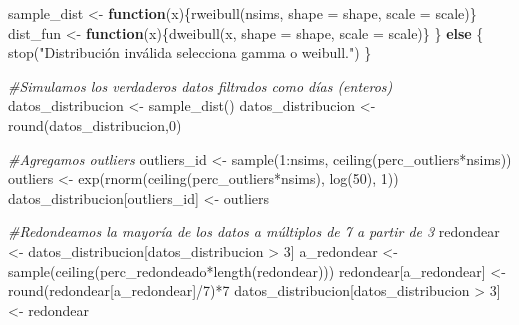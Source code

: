 \documentclass[
]{article}
\newenvironment{Shaded}{\begin{snugshade}}{\end{snugshade}}
\newcommand{\AttributeTok}[1]{\textcolor[rgb]{0.77,0.63,0.00}{#1}}
\newcommand{\CommentTok}[1]{\textcolor[rgb]{0.56,0.35,0.01}{\textit{#1}}}
\newcommand{\ControlFlowTok}[1]{\textcolor[rgb]{0.13,0.29,0.53}{\textbf{#1}}}
\newcommand{\DecValTok}[1]{\textcolor[rgb]{0.00,0.00,0.81}{#1}}
\newcommand{\FunctionTok}[1]{\textcolor[rgb]{0.00,0.00,0.00}{#1}}
\newcommand{\NormalTok}[1]{#1}
\newcommand{\OtherTok}[1]{\textcolor[rgb]{0.56,0.35,0.01}{#1}}
\newcommand{\SpecialCharTok}[1]{\textcolor[rgb]{0.00,0.00,0.00}{#1}}
\newcommand{\StringTok}[1]{\textcolor[rgb]{0.31,0.60,0.02}{#1}}
\begin{document}
\begin{Shaded}
\begin{Highlighting}[]
\NormalTok{  sample\_dist  }\OtherTok{\textless{}{-}} \ControlFlowTok{function}\NormalTok{(x)\{}\FunctionTok{rweibull}\NormalTok{(nsims, }\AttributeTok{shape =}\NormalTok{ shape, }\AttributeTok{scale =}\NormalTok{ scale)\}}
\NormalTok{  dist\_fun     }\OtherTok{\textless{}{-}} \ControlFlowTok{function}\NormalTok{(x)\{}\FunctionTok{dweibull}\NormalTok{(x, }\AttributeTok{shape =}\NormalTok{ shape, }\AttributeTok{scale =}\NormalTok{ scale)\}}
\NormalTok{\} }\ControlFlowTok{else}\NormalTok{ \{}
  \FunctionTok{stop}\NormalTok{(}\StringTok{"Distribución inválida selecciona \textquotesingle{}gamma\textquotesingle{} o \textquotesingle{}weibull\textquotesingle{}."}\NormalTok{)}
\NormalTok{\}}

\CommentTok{\#Simulamos los verdaderos datos filtrados como días (enteros)}
\NormalTok{datos\_distribucion }\OtherTok{\textless{}{-}} \FunctionTok{sample\_dist}\NormalTok{()}
\NormalTok{datos\_distribucion }\OtherTok{\textless{}{-}} \FunctionTok{round}\NormalTok{(datos\_distribucion,}\DecValTok{0}\NormalTok{)}

\CommentTok{\#Agregamos outliers}
\NormalTok{outliers\_id }\OtherTok{\textless{}{-}} \FunctionTok{sample}\NormalTok{(}\DecValTok{1}\SpecialCharTok{:}\NormalTok{nsims, }\FunctionTok{ceiling}\NormalTok{(perc\_outliers}\SpecialCharTok{*}\NormalTok{nsims))}
\NormalTok{outliers    }\OtherTok{\textless{}{-}} \FunctionTok{exp}\NormalTok{(}\FunctionTok{rnorm}\NormalTok{(}\FunctionTok{ceiling}\NormalTok{(perc\_outliers}\SpecialCharTok{*}\NormalTok{nsims), }\FunctionTok{log}\NormalTok{(}\DecValTok{50}\NormalTok{), }\DecValTok{1}\NormalTok{))}
\NormalTok{datos\_distribucion[outliers\_id] }\OtherTok{\textless{}{-}}\NormalTok{ outliers}

\CommentTok{\#Redondeamos la mayoría de los datos a múltiplos de 7 a partir de 3}
\NormalTok{redondear   }\OtherTok{\textless{}{-}}\NormalTok{ datos\_distribucion[datos\_distribucion }\SpecialCharTok{\textgreater{}} \DecValTok{3}\NormalTok{]}
\NormalTok{a\_redondear }\OtherTok{\textless{}{-}} \FunctionTok{sample}\NormalTok{(}\FunctionTok{ceiling}\NormalTok{(perc\_redondeado}\SpecialCharTok{*}\FunctionTok{length}\NormalTok{(redondear)))}
\NormalTok{redondear[a\_redondear]                     }\OtherTok{\textless{}{-}} \FunctionTok{round}\NormalTok{(redondear[a\_redondear]}\SpecialCharTok{/}\DecValTok{7}\NormalTok{)}\SpecialCharTok{*}\DecValTok{7}
\NormalTok{datos\_distribucion[datos\_distribucion }\SpecialCharTok{\textgreater{}} \DecValTok{3}\NormalTok{] }\OtherTok{\textless{}{-}}\NormalTok{ redondear}


\end{Highlighting}
\end{Shaded}
\end{document}
